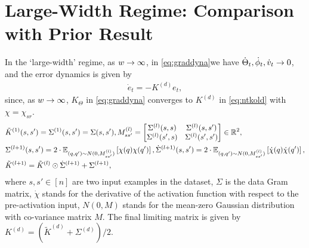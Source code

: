\section{Large-Width Regime: Comparison with Prior Result}\label{sec:exact}
In the `large-width' regime, as $w\rightarrow\infty$, in \eqref{eq:graddyna}we have $\dot{\Theta}_t, \dot{\phi}_t, \dot{v}_t\rightarrow 0$, and the error dynamics is given by
\begin{align}
\dot{e}_t=-K^{(d)} e_t,
\end{align}
since, as $w\rightarrow\infty$, $K_{\Theta}$ in \eqref{eq:graddyna} converges to $K^{(d)}$ in \eqref{eq:ntkold} with $\chi=\chi_{sr}$. 
\begin{align}\label{eq:ntkold}
&\tilde{K}^{(1)}(s,s')=\Sigma^{(1)}(s,s')=\Sigma(s,s'), M^{(l)}_{ss'}=\left[\begin{matrix}\Sigma^{(l)}(s,s) & \Sigma^{(l)}(s,s')\\ \Sigma^{(l)}(s',s) & \Sigma^{(l)}(s',s')\end{matrix}\right]\in \mathbb{R}^2,\\
&\Sigma^{(l+1)}(s,s')= 2\cdot\mathbb{E}_{(q,q')\sim N(0,M_{ss'}^{(l)})} \left[\chi(q)\chi(q')\right], \dot{\Sigma}^{(l+1)}(s,s')= 2\cdot\mathbb{E}_{(q,q')\sim N(0,M_{ss'}^{(l)})}\left[\dot{\chi}(q)\dot{\chi}(q')\right],\nonumber\\
&\tilde{K}^{(l+1)}=\tilde{K}^{(l)}\odot \dot{\Sigma}^{(l+1)}+\Sigma^{(l+1)},\nonumber
\end{align}
where $s,s'\in[n]$ are two input examples in the dataset, $\Sigma$ is the data Gram matrix, $\dot{\chi}$ stands for the derivative of the activation function with respect to the pre-activation input, $N(0,M)$ stands for the mean-zero Gaussian distribution with co-variance matrix $M$. The final limiting matrix is given by $K^{(d)}=\left(\tilde{K}^{(d)}+\Sigma^{(d)}\right)/2$. 

